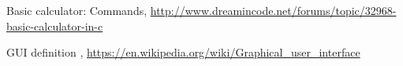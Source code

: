 \begin{thebibliography}{99999}
\singlespace\normalsize

\bibitem{} Basic calculator: Commands, \url{http://www.dreamincode.net/forums/topic/32968-basic-calculator-in-c}


 GUI definition , \url{https://en.wikipedia.org/wiki/Graphical_user_interface}



\end{thebibliography}
